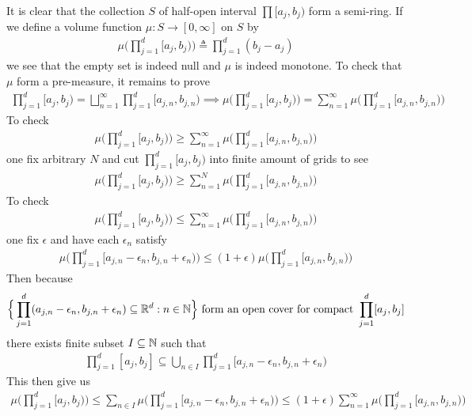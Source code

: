\documentclass{report}
\begin{document}
\begin{mdframed}
It is clear that the collection $S$ of half-open interval $\prod [a_j,b_j)$ form a semi-ring. If we define a volume function $\mu : S\rightarrow [0,\infty]$ on  $S$ by 
 \begin{align*}
\mu \Big( \prod_{j=1}^d [a_j,b_j) \Big)\triangleq  \prod_{j=1}^d (b_j-a_j)
\end{align*}
we see that the empty set is indeed null and $\mu$ is indeed monotone. To check that $\mu$ form a pre-measure, it remains to prove 
\begin{align*}
\prod_{j=1}^d [a_j,b_j)= \bigsqcup_{n=1}^{\infty} \prod_{j=1}^d [a_{j,n},b_{j,n}) \implies \mu \Big(\prod_{j=1}^d [a_j,b_j) \Big)= \sum_{n=1}^{\infty} \mu \Big(\prod_{j=1}^d [a_{j,n},b_{j,n}) \Big)
\end{align*}
To check 
\begin{align}
\mu \Big(\prod_{j=1}^d [a_j,b_j) \Big) \geq \sum_{n=1}^{\infty} \mu \Big(\prod_{j=1}^d [a_{j,n},b_{j,n}) \Big)
\end{align}
one fix arbitrary $N$ and cut  $\prod_{j=1}^d [a_j,b_j)$ into finite amount of grids to see  
\begin{align*}
\mu \Big(\prod_{j=1}^d [a_j,b_j) \Big) \geq \sum_{n=1}^{N} \mu \Big(\prod_{j=1}^d [a_{j,n},b_{j,n}) \Big)
\end{align*}
To check 
\begin{align*}
\label{58}
\mu \Big(\prod_{j=1}^d [a_j,b_j) \Big)\leq \sum_{n=1}^{\infty} \mu \Big(\prod _{j=1}^d [a_{j,n},b_{j,n}) \Big)
\end{align*}
one fix $\epsilon$ and have each $\epsilon _n$ satisfy 
\begin{align*}
  \mu \Big(\prod_{j=1}^d [a_{j,n}-\epsilon_n , b_{j,n}+\epsilon_n) \Big) \leq (1+\epsilon )\mu  \Big(\prod_{j=1}^d [a_{j,n},b_{j,n}) \Big)
\end{align*}
Then because  
\begin{align*}
\Big\{ \prod_{j=1}^d (a_{j,n}-\epsilon_n , b_{j,n}+\epsilon_n )\subseteq \mathbb{R}^d:n\in\mathbb{N} \Big\}\text{ form an open cover for compact }\prod_{j=1}^d [a_j,b_j]
\end{align*}
there exists finite subset $I \subseteq \mathbb{N}$ such that 
\begin{align*}
\prod_{j=1}^d [a_j,b_j]\subseteq \bigcup_{n \in I} \prod_{j=1}^d [a_{j,n}-\epsilon _n, b_{j,n}+\epsilon _n)
\end{align*}
This then give us 
\begin{align*}
\mu \Big(\prod_{j=1}^d [a_j,b_j)\Big)\leq \sum_{n \in I}\mu \Big(\prod_{j=1}^d [a_{j,n}-\epsilon _n, b_{j,n}+\epsilon _n) \Big) \leq (1+\epsilon )\sum_{n=1}^{\infty} \mu \Big(\prod_{j=1}^d [a_{j,n},b_{j,n}) \Big)

\end{align*}
\end{mdframed}
\end{document}
